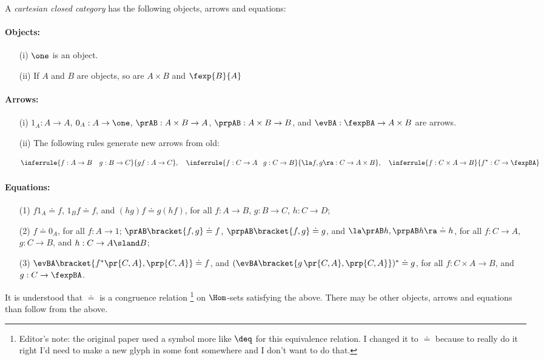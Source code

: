 \begin{defn}
A {\em cartesian closed category} has the following objects,
arrows and equations:

\paragraph{Objects:}
\begin{enumerate}
\item[(i)] $\one$ is an object.
\item[(ii)] If $A$ and $B$ are objects, so are $A \times B$ and $\fexp{B}{A}$
\end{enumerate}

\paragraph{Arrows:}
\begin{enumerate}
\item[(i)] $1_A: A \to A$, $0_A: A \to \one$, $\prAB: A \times B \to A$, $\prpAB: A \times B \to B$, and $\evBA: \fexpBA \to A \times B$ are arrows.

\item[(ii)] The following rules generate new arrows from old:

\[
\inferrule {f: A \to B \quad g: B \to C}{gf: A \to C},\quad
\inferrule {f: C \to A \quad\! g: C \to B}{\la f, g \ra: C \to A \times B}, \quad
\inferrule {f: C \times A \to B}{f^*: C \to \fexpBA}
\]

\end{enumerate}

\paragraph{Equations:}
\begin{enumerate}
\item[(1)] $f1_A \doteq f$, $1_Bf \doteq f$, and $(hg)f \doteq g(hf)$,
for all $f:A \to B$, $g:B \to C$, $h: C\to D$;
\item[(2)] $f \doteq 0_A$, for all $f: A \to 1$;
$\prAB\bracket{f,g} \doteq f$, $\prpAB\bracket{f,g} \doteq g$, and
$\la\prAB h, \prpAB h\ra \doteq h$,
for all $f:C \to A$, $g:C \to B$, and $h: C\to A\sland B$;
\item[(3)] $\evBA\bracket{f^*\pr{C,A}, \prp{C,A}} \doteq f$, and
$(\evBA\bracket{g\,\pr{C,A}, \prp{C,A}})^* \doteq g$,
for all $f: C\times A \to B$, and $g: C \to \fexpBA$.
\end{enumerate}

\end{defn}
\noindent
It is understood that $\doteq$ is a congruence relation%
\footnote{Editor's note: the original paper used a symbol more like $\deq$ for this equivalence relation. I changed it to $\doteq$ because to really do it right I'd need to make a new glyph in some font somewhere and I don't want to do that.}
on $\Hom$-sets satisfying the
above. There may be other objects, arrows and equations than follow from the
above.

